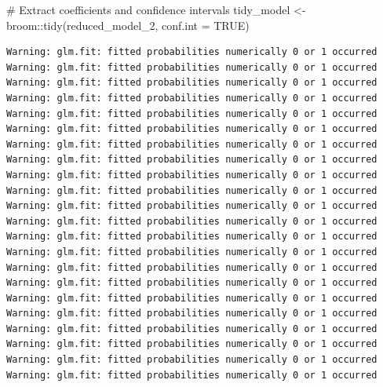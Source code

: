 \documentclass[
  letterpaper,
  DIV=11,
  numbers=noendperiod]{scrartcl}
\newenvironment{Shaded}{\begin{snugshade}}{\end{snugshade}}
\newcommand{\AttributeTok}[1]{\textcolor[rgb]{0.40,0.45,0.13}{#1}}
\newcommand{\CommentTok}[1]{\textcolor[rgb]{0.37,0.37,0.37}{#1}}
\newcommand{\ConstantTok}[1]{\textcolor[rgb]{0.56,0.35,0.01}{#1}}
\newcommand{\FunctionTok}[1]{\textcolor[rgb]{0.28,0.35,0.67}{#1}}
\newcommand{\NormalTok}[1]{\textcolor[rgb]{0.00,0.23,0.31}{#1}}
\newcommand{\OtherTok}[1]{\textcolor[rgb]{0.00,0.23,0.31}{#1}}
\newcommand{\SpecialCharTok}[1]{\textcolor[rgb]{0.37,0.37,0.37}{#1}}
\begin{document}
\begin{Shaded}
\begin{Highlighting}[]
\CommentTok{\# Extract coefficients and confidence intervals}
\NormalTok{tidy\_model }\OtherTok{\textless{}{-}}\NormalTok{ broom}\SpecialCharTok{::}\FunctionTok{tidy}\NormalTok{(reduced\_model\_2, }\AttributeTok{conf.int =} \ConstantTok{TRUE}\NormalTok{)}
\end{Highlighting}
\end{Shaded}

\begin{verbatim}
Warning: glm.fit: fitted probabilities numerically 0 or 1 occurred
Warning: glm.fit: fitted probabilities numerically 0 or 1 occurred
Warning: glm.fit: fitted probabilities numerically 0 or 1 occurred
Warning: glm.fit: fitted probabilities numerically 0 or 1 occurred
Warning: glm.fit: fitted probabilities numerically 0 or 1 occurred
Warning: glm.fit: fitted probabilities numerically 0 or 1 occurred
Warning: glm.fit: fitted probabilities numerically 0 or 1 occurred
Warning: glm.fit: fitted probabilities numerically 0 or 1 occurred
Warning: glm.fit: fitted probabilities numerically 0 or 1 occurred
Warning: glm.fit: fitted probabilities numerically 0 or 1 occurred
Warning: glm.fit: fitted probabilities numerically 0 or 1 occurred
Warning: glm.fit: fitted probabilities numerically 0 or 1 occurred
Warning: glm.fit: fitted probabilities numerically 0 or 1 occurred
Warning: glm.fit: fitted probabilities numerically 0 or 1 occurred
Warning: glm.fit: fitted probabilities numerically 0 or 1 occurred
Warning: glm.fit: fitted probabilities numerically 0 or 1 occurred
Warning: glm.fit: fitted probabilities numerically 0 or 1 occurred
Warning: glm.fit: fitted probabilities numerically 0 or 1 occurred
Warning: glm.fit: fitted probabilities numerically 0 or 1 occurred
Warning: glm.fit: fitted probabilities numerically 0 or 1 occurred
Warning: glm.fit: fitted probabilities numerically 0 or 1 occurred
Warning: glm.fit: fitted probabilities numerically 0 or 1 occurred
\end{verbatim}
\end{document}
